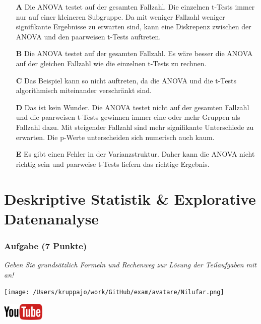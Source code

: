 \documentclass[a4paper, 9pt]{scrartcl}\usepackage[]{graphicx}\usepackage[]{xcolor}
\begin{document}
\begin{enumerate}
\item [\textbf{A} \msquare] Die ANOVA testet auf der gesamten Fallzahl. Die einzelnen t-Tests immer nur auf einer kleineren Subgruppe. Da mit weniger Fallzahl weniger signifikante Ergebnisse zu erwarten sind, kann eine Diskrepenz zwischen der ANOVA und den paarweisen t-Tests auftreten.
\item [\textbf{B} \msquare] Die ANOVA testet auf der gesamten Fallzahl. Es wäre besser die ANOVA auf der gleichen Fallzahl wie die einzelnen t-Tests zu rechnen.
\item [\textbf{C} \msquare] Das Beispiel kann so nicht auftreten, da die ANOVA und die t-Tests algorithmisch miteinander verschränkt sind.
\item [\textbf{D} \msquare] Das ist kein Wunder. Die ANOVA testet nicht auf der gesamten Fallzahl und die paarweisen t-Tests gewinnen immer eine oder mehr Gruppen als Fallzahl dazu. Mit steigender Fallzahl sind mehr signifikante Unterschiede zu erwarten. Die p-Werte unterscheiden sich numerisch auch kaum.
\item [\textbf{E} \msquare] Es gibt einen Fehler in der Varianzstruktur. Daher kann die ANOVA nicht richtig sein und paarweise t-Tests liefern das richtige Ergebnis.
\end{enumerate}
    
\clearpage
\part{Deskriptive Statistik \& Explorative Datenanalyse}

\section{Aufgabe \hfill (7 Punkte)}

\textit{Geben Sie grundsätzlich Formeln und Rechenweg zur Lösung der Teilaufgaben mit an!} \\[1Ex]
 

 
\begin{minipage}[t]{0.5\textwidth}
\texttt{[image: /Users/kruppajo/work/GitHub/exam/avatare/Nilufar.png]}
\end{minipage}
\begin{minipage}[t]{0.5\textwidth}
\hfill
\href{https://youtu.be/t0WYa_LVc5o}{\includegraphics[width = 2cm]{img/youtube}}\\[1Ex]
\end{minipage}
\vspace{1ex}
\end{document}
